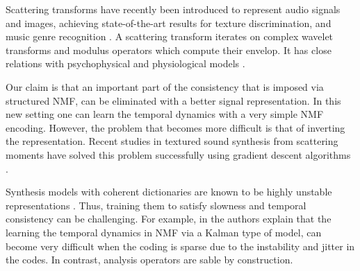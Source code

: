 Scattering transforms have recently been introduced \cite{XX} to represent audio signals and images, achieving state-of-the-art results for texture discrimination, and music genre recognition \cite{XX}. A scattering transform iterates on complex wavelet transforms and modulus operators which compute their envelop. It has close relations with psychophysical and physiological models \cite{XX}. %

Our claim is that an important part of the consistency that is imposed via structured NMF, can be eliminated with a better signal representation.
In this new setting one can learn the temporal dynamics with a very simple NMF encoding. However, the problem that becomes
more difficult is that of inverting the representation. Recent studies in textured sound synthesis from scattering
moments have solved this problem successfully using gradient descent algorithms \cite{bruna2013audio}.

Synthesis models with coherent dictionaries are known to be highly unstable representations \cite{jenatton2012local}. 
Thus, training them to satisfy slowness and temporal consistency can be challenging. For example, in \cite{icassp13a}
the authors explain that the learning the temporal dynamics in NMF via a Kalman type of model, can become very difficult
when the coding is sparse due to the instability and jitter in the codes.
In contrast, analysis operators are sable by construction.




